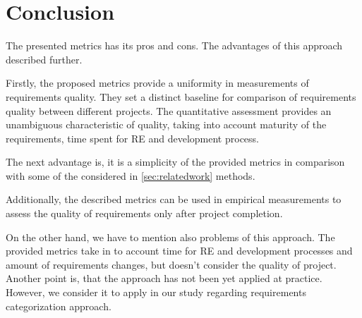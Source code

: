 \section{Conclusion}
\label{sec:conclusion}
The presented metrics has its pros and cons. The advantages of this approach described further. 

Firstly, the proposed metrics provide a uniformity in measurements of requirements quality. They set a distinct baseline for comparison of requirements quality between different projects. The quantitative assessment provides an unambiguous characteristic of quality, taking into account maturity of the requirements, time spent for RE and development process.

The next advantage is, it is a simplicity of the provided metrics in comparison with some of the considered in \autoref{sec:relatedwork} methods. 

Additionally, the described metrics can be used in empirical measurements to assess the quality of requirements only after project completion.

On the other hand, we have to mention also problems of this approach. The provided metrics take in to account time for RE and development processes and amount of requirements changes, but doesn't consider the quality of project. Another point is, that the approach has not been yet applied at practice. However, we consider it to apply in our study regarding requirements categorization approach.



